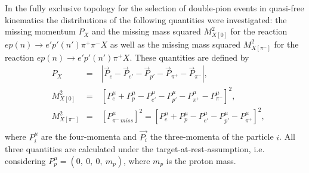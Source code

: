In the fully exclusive topology for the selection of double-pion events in quasi-free kinematics the distributions of the following quantities were investigated: the missing momentum $P_{X}$ and the missing mass squared $M^{2}_{X[0]}$ for the reaction $ep(n)\rightarrow e'p'(n')\pi^{+}\pi^{-}X$ as well as the missing mass squared $M^{2}_{X[\pi^{-}]}$ for the reaction $ep(n)\rightarrow e'p'(n')\pi^{+}X$. These quantities are defined by
\begin{equation}
\begin{aligned}
&P_{X}&=&~|\overrightarrow{P}_{e} - \overrightarrow{P}_{e'}- \overrightarrow{P}_{p'} - \overrightarrow{P}_{\pi^{+}} - \overrightarrow{P}_{\pi^{-}}|,\\[8pt]
&M_{X[0]}^{2}&=&~[P_{e}^{\mu} + P_{p}^{\mu}- P_{e'}^{\mu}- P_{p'}^{\mu}-  P_{\pi^{+}}^{\mu} - P_{\pi^{-}}^{\mu}]^{2},\\[8pt]
&M_{X[\pi^{-}]}^{2}&=&~[P_{\pi^{-}~miss}^{\mu}]^{2}=[P_{e}^{\mu} + P_{p}^{\mu}- P_{e'}^{\mu}- P_{p'}^{\mu}-  P_{\pi^{+}}^{\mu}]^{2},\\
\end{aligned}\label{eq:excl_top_quant}
\end{equation}%
where $P_{i}^{\mu}$ are the four-momenta and $\overrightarrow{P_{i}}$ the three-momenta of the particle $i$. All three quantities are calculated under the target-at-rest-assumption, i.e. considering $P^{\mu}_{p} = (0,~0,~0,~m_{p})$, where $m_{p}$ is the proton mass.


